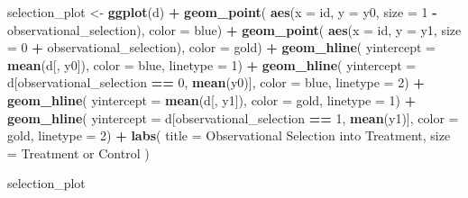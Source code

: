 \documentclass[
]{article}
\newenvironment{Shaded}{\begin{snugshade}}{\end{snugshade}}
\newcommand{\AttributeTok}[1]{\textcolor[rgb]{0.13,0.29,0.53}{#1}}
\newcommand{\DecValTok}[1]{\textcolor[rgb]{0.00,0.00,0.81}{#1}}
\newcommand{\FunctionTok}[1]{\textcolor[rgb]{0.13,0.29,0.53}{\textbf{#1}}}
\newcommand{\NormalTok}[1]{#1}
\newcommand{\OtherTok}[1]{\textcolor[rgb]{0.56,0.35,0.01}{#1}}
\newcommand{\SpecialCharTok}[1]{\textcolor[rgb]{0.81,0.36,0.00}{\textbf{#1}}}
\newcommand{\StringTok}[1]{\textcolor[rgb]{0.31,0.60,0.02}{#1}}
\theoremstyle{definition}
\theoremstyle{definition}
\theoremstyle{definition}
\theoremstyle{definition}
\theoremstyle{remark}
\begin{document}
\begin{Shaded}
\begin{Highlighting}[]
\NormalTok{selection\_plot }\OtherTok{\textless{}{-}} \FunctionTok{ggplot}\NormalTok{(d) }\SpecialCharTok{+} 
  \FunctionTok{geom\_point}\NormalTok{(}
    \FunctionTok{aes}\NormalTok{(}\AttributeTok{x =}\NormalTok{ id, }\AttributeTok{y =}\NormalTok{ y0, }\AttributeTok{size =} \DecValTok{1} \SpecialCharTok{{-}}\NormalTok{ observational\_selection), }
    \AttributeTok{color =}\NormalTok{ blue) }\SpecialCharTok{+} 
  \FunctionTok{geom\_point}\NormalTok{(}
    \FunctionTok{aes}\NormalTok{(}\AttributeTok{x =}\NormalTok{ id, }\AttributeTok{y =}\NormalTok{ y1, }\AttributeTok{size =} \DecValTok{0} \SpecialCharTok{+}\NormalTok{ observational\_selection), }\AttributeTok{color =}\NormalTok{ gold) }\SpecialCharTok{+} 
  \FunctionTok{geom\_hline}\NormalTok{(}
    \AttributeTok{yintercept =} \FunctionTok{mean}\NormalTok{(d[, y0]), }
    \AttributeTok{color =}\NormalTok{ blue, }
    \AttributeTok{linetype =} \DecValTok{1}\NormalTok{) }\SpecialCharTok{+} 
  \FunctionTok{geom\_hline}\NormalTok{(}
    \AttributeTok{yintercept =}\NormalTok{ d[observational\_selection }\SpecialCharTok{==} \DecValTok{0}\NormalTok{, }\FunctionTok{mean}\NormalTok{(y0)], }
    \AttributeTok{color =}\NormalTok{ blue, }
    \AttributeTok{linetype =} \DecValTok{2}\NormalTok{) }\SpecialCharTok{+} 
  \FunctionTok{geom\_hline}\NormalTok{(}
    \AttributeTok{yintercept =} \FunctionTok{mean}\NormalTok{(d[, y1]), }
    \AttributeTok{color =}\NormalTok{ gold, }
    \AttributeTok{linetype =} \DecValTok{1}\NormalTok{) }\SpecialCharTok{+}
  \FunctionTok{geom\_hline}\NormalTok{(}
    \AttributeTok{yintercept =}\NormalTok{ d[observational\_selection }\SpecialCharTok{==} \DecValTok{1}\NormalTok{, }\FunctionTok{mean}\NormalTok{(y1)], }
    \AttributeTok{color =}\NormalTok{ gold, }
    \AttributeTok{linetype =} \DecValTok{2}\NormalTok{) }\SpecialCharTok{+} 
  \FunctionTok{labs}\NormalTok{(}
    \AttributeTok{title =} \StringTok{\textquotesingle{}Observational Selection into Treatment\textquotesingle{}}\NormalTok{, }
    \AttributeTok{size =} \StringTok{\textquotesingle{}Treatment or Control\textquotesingle{}}
\NormalTok{  )}

\NormalTok{selection\_plot}
\end{Highlighting}
\end{Shaded}
\end{document}
